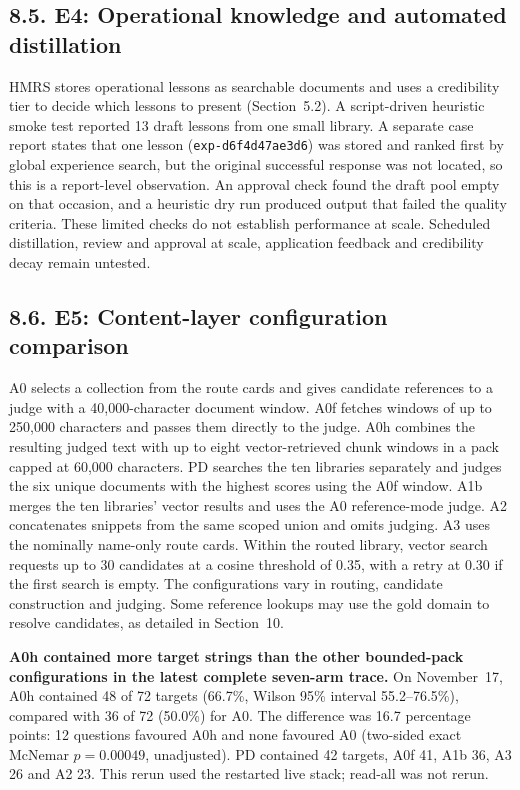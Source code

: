\subsection{8.5. E4: Operational knowledge and automated distillation}

HMRS stores operational lessons as searchable documents and uses a
credibility tier to decide which lessons to present
(Section~5.2). A script-driven heuristic smoke test
reported 13 draft lessons from one small library. A separate case report
states that one lesson (\texttt{exp-d6f4d47ae3d6}) was stored and ranked
first by global experience search, but the original successful response
was not located, so this is a report-level observation. An approval check
found the draft pool empty on that occasion, and a heuristic dry run
produced output that failed the quality criteria. These limited checks do
not establish performance at scale. Scheduled distillation, review and
approval at scale, application feedback and credibility decay remain
untested.

\subsection{8.6. E5: Content-layer configuration comparison}

A0 selects a collection from the route cards and gives candidate references
to a judge with a 40{,}000-character document window. A0f fetches windows of
up to 250{,}000 characters and passes them directly to the judge. A0h
combines the resulting judged text with up to eight vector-retrieved chunk
windows in a pack capped at 60{,}000 characters. PD searches the ten libraries
separately and judges the six unique documents with the highest scores using
the A0f window. A1b merges the ten libraries' vector results and uses the A0
reference-mode judge. A2 concatenates snippets from the same scoped union
and omits judging. A3 uses the nominally name-only route cards. Within the
routed library, vector search requests up to 30 candidates at a cosine
threshold of 0.35, with a retry at 0.30 if the first search is empty.
The configurations vary in routing, candidate construction and judging.
Some reference lookups may use the gold domain to resolve candidates,
as detailed in Section~10.

\textbf{A0h contained more target strings than the other bounded-pack
configurations in the latest complete seven-arm trace.} On November~17,
A0h contained 48 of 72 targets (66.7\%, Wilson 95\% interval
55.2--76.5\%), compared with 36 of 72 (50.0\%) for A0. The difference
was 16.7 percentage points: 12 questions favoured A0h and none favoured
A0 (two-sided exact McNemar $p=0.00049$, unadjusted). PD contained 42
targets, A0f 41, A1b 36, A3 26 and A2 23. This rerun used the
restarted live stack; read-all was not rerun.

